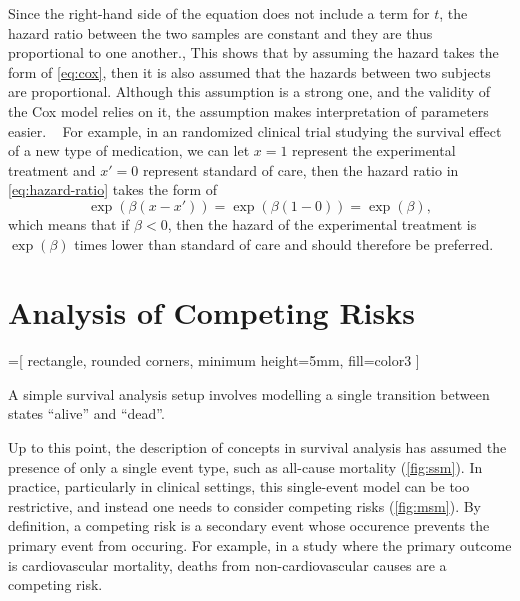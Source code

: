 Since the right-hand side of the equation does not include a term for \(t\),
the hazard ratio between the two samples are constant and 
they are thus proportional to one another., 
This shows that by assuming the hazard takes the form of \cref{eq:cox},
then it is also assumed that the hazards between two subjects are proportional.
Although this assumption is a strong one, 
and the validity of the Cox model relies on it, 
the assumption makes interpretation of parameters easier.
~\autocite{tutzModeling2016}
For example, 
in an randomized clinical trial
studying the survival effect of a new type of medication, 
we can let \(x = 1\) represent the experimental treatment  
and \(x' = 0\) represent standard of care, 
then the hazard ratio in \cref{eq:hazard-ratio} takes the form of
%
\begin{equation}
      \exp \left(\beta (x - x')\right)
    = \exp \left(\beta (1 - 0)\right)
    = \exp (\beta ),
\end{equation}
%
which means that if \(\beta < 0\), 
then the hazard of the experimental treatment is 
\(\exp({\beta})\) times lower than standard of care
and should therefore be preferred.%


\section{Analysis of Competing Risks}

\begin{marginfigure}[3em]%
    =[%
        rectangle, rounded corners, minimum height=5mm, fill=color3
    ]
    \centering
    \caption[A Single State Model]{
        A simple survival analysis setup 
        involves modelling a single transition between states 
        \enquote{alive} and \enquote{dead}.
    }
    \label{fig:ssm}
\end{marginfigure}%

Up to this point, the description of concepts in survival analysis has
assumed the presence of only a single event type, such as all-cause mortality
(\cref{fig:ssm}).
In practice, particularly in clinical settings, 
this single-event model can be too restrictive,
and instead one needs to consider competing risks
(\cref{fig:msm}).
By definition, a competing risk is a secondary event whose occurence 
prevents the primary event from occuring.
For example,
in a study where the primary outcome is cardiovascular mortality,
deaths from non-cardiovascular causes are a competing risk.

